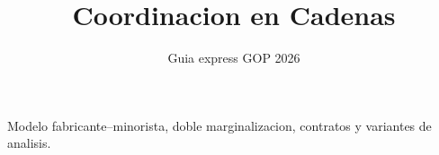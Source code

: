 \documentclass[11pt,a4paper]{article}
\title{\textbf{Coordinacion en Cadenas}}
\author{Guia express GOP 2026}
\date{}
\begin{document}
\maketitle

\begin{center}
\large Modelo fabricante--minorista, doble marginalizacion, contratos y variantes de analisis.
\end{center}

\tableofcontents
\newpage


\newpage


\newpage


\newpage


\newpage


\newpage

\end{document}
